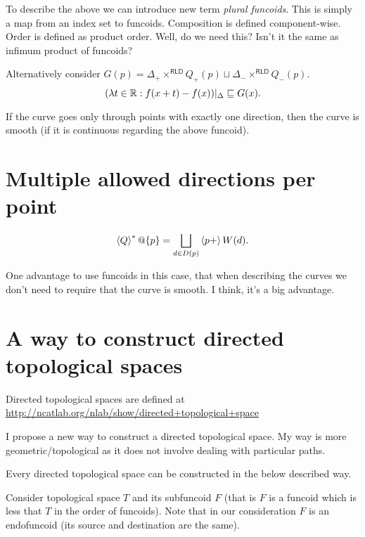 To describe the above we can introduce new term \emph{plural funcoids}. This is simply a map
from an index set to funcoids. Composition is defined component-wise. Order is defined as product order.
Well, do we need this? Isn't it the same as infimum product of funcoids?

Alternatively consider $G(p) = \Delta_+\times^{\mathsf{RLD}}Q_+(p) \sqcup \Delta_-\times^{\mathsf{RLD}}Q_-(p)$.
\[(\lambda t\in\mathbb{R}:f(x+t)-f(x))|_{\Delta} \sqsubseteq G(x). \]

\begin{conjecture}
If the curve goes only through points with exactly one direction, then the curve is smooth (if it is continuous regarding the above funcoid).
\end{conjecture}


\section{Multiple allowed directions per point}

\[ \left\langle Q\right\rangle ^{\ast}@\{p\} = \bigsqcup_{d\in D(p)} \left\langle p+\right\rangle W(d). \]

One advantage to use funcoids in this case, that when describing the curves we don't need to require that the curve is smooth. I think, it's a big advantage.

\section{A way to construct directed topological spaces}


Directed topological spaces are defined at\\
\url{http://ncatlab.org/nlab/show/directed+topological+space}

I propose a new way to construct a directed topological space. My way is more geometric/topological as it does not involve dealing with particular paths.

\begin{conjecture}
Every directed topological space can be constructed in the below described way.
\end{conjecture}

Consider topological space $T$ and its subfuncoid $F$ (that is $F$ is a funcoid which is less that $T$ in the order of funcoids).
Note that in our consideration $F$ is an endofuncoid (its source and destination are the same).

